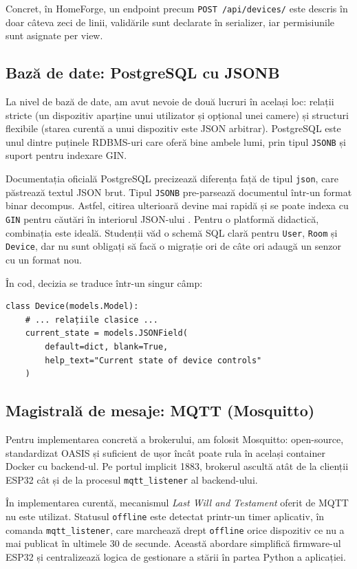 Concret, în HomeForge, un endpoint precum \texttt{POST /api/devices/} este descris în doar câteva zeci de linii, validările sunt declarate în serializer, iar permisiunile sunt asignate per view.

\subsection{Bază de date: PostgreSQL cu JSONB}
La nivel de bază de date, am avut nevoie de două lucruri în același loc: relații stricte (un dispozitiv aparține unui utilizator și opțional unei camere) și structuri flexibile (starea curentă a unui dispozitiv este JSON arbitrar). PostgreSQL este unul dintre puținele RDBMS-uri care oferă bine ambele lumi, prin tipul \texttt{JSONB} și suport pentru indexare GIN.

Documentația oficială PostgreSQL precizează diferența față de tipul \texttt{json}, care păstrează textul JSON brut. Tipul \texttt{JSONB} pre-parsează documentul într-un format binar decompus. Astfel, citirea ulterioară devine mai rapidă și se poate indexa cu \texttt{GIN} pentru căutări în interiorul JSON-ului \cite{postgresql_jsonb_docs}. Pentru o platformă didactică, combinația este ideală. Studenții văd o schemă SQL clară pentru \texttt{User}, \texttt{Room} și \texttt{Device}, dar nu sunt obligați să facă o migrație ori de câte ori adaugă un senzor cu un format nou.

În cod, decizia se traduce într-un singur câmp:
\begin{verbatim}
class Device(models.Model):
    # ... relațiile clasice ...
    current_state = models.JSONField(
        default=dict, blank=True,
        help_text="Current state of device controls"
    )
\end{verbatim}

\subsection{Magistrală de mesaje: MQTT (Mosquitto)}
Pentru implementarea concretă a brokerului, am folosit Mosquitto: open-source, standardizat OASIS și suficient de ușor încât poate rula în același container Docker cu backend-ul. Pe portul implicit 1883, brokerul ascultă atât de la clienții ESP32 cât și de la procesul \texttt{mqtt\_listener} al backend-ului.

În implementarea curentă, mecanismul \textit{Last Will and Testament} oferit de MQTT nu este utilizat. Statusul \texttt{offline} este detectat printr-un timer aplicativ, în comanda \texttt{mqtt\_listener}, care marchează drept \texttt{offline} orice dispozitiv ce nu a mai publicat în ultimele 30 de secunde. Această abordare simplifică firmware-ul ESP32 și centralizează logica de gestionare a stării în partea Python a aplicației.

